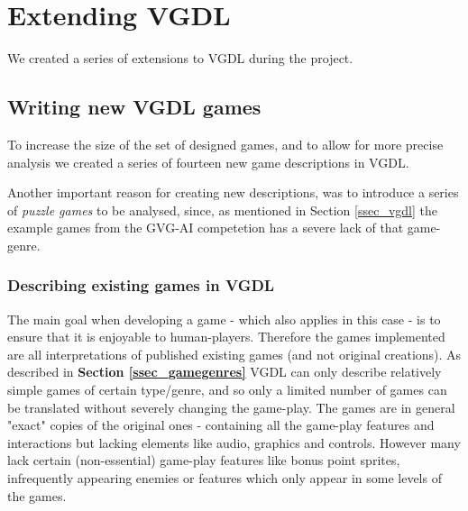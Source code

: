 \documentclass[a4paper,titlepage,final, twoside]{report}
\begin{document}

\chapter{Extending VGDL}
\label{ch_extending}

We created a series of extensions to VGDL during the project.



\section{Writing new VGDL games}

To increase the size of the set of designed games, and to allow for more precise analysis we created a series of fourteen new game descriptions in VGDL. 

Another important reason for creating new descriptions, was to introduce a series of \emph{puzzle games} to be analysed, since, as mentioned in Section \ref{ssec_vgdl} the example games from the GVG-AI competetion has a severe lack of that game-genre. 


\subsection{Describing existing games in VGDL}
The main goal when developing a game - which also applies in this case - is to ensure that it is enjoyable to human-players. 
Therefore the games implemented are all interpretations of published existing games (and not original creations).
As described in \textbf{Section \ref{ssec_gamegenres}} VGDL can only describe relatively simple games of certain type/genre, and so only a limited number of games can be translated without severely changing the game-play.
The games are in general "exact" copies of the original ones - containing all the game-play features and interactions but lacking elements like audio, graphics and controls. However many lack certain (non-essential) game-play features like bonus point sprites, infrequently appearing enemies or features which only appear in some levels of the games.
\end{document}

